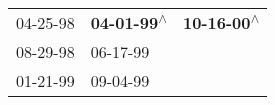 \begin{supertabular}{lll}
 04-25-98\textsuperscript{} &  \textbf{04-01-99\textsuperscript{$\wedge$}} &  \textbf{10-16-00\textsuperscript{$\wedge$}} \\
 08-29-98\textsuperscript{} &                   06-17-99\textsuperscript{} &                                              \\
 01-21-99\textsuperscript{} &                   09-04-99\textsuperscript{} &                                              \\
\end{supertabular}
